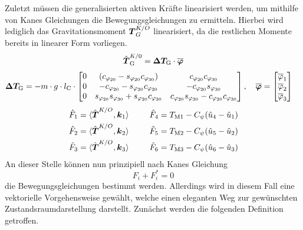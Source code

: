 Zuletzt müssen die generalisierten aktiven Kräfte linearisiert werden, um mithilfe von Kanes Gleichungen die Bewegungsgleichungen zu ermitteln. Hierbei wird lediglich das Gravitationsmoment $\boldsymbol{T}^{K/O}_G$ linearisiert, da die restlichen Momente bereits in linearer Form vorliegen.
\begin{align}
\hat{\boldsymbol{T}}^{K/0}_{\text{G}} = \boldsymbol{\Delta T_{\text{G}}} \cdot \boldsymbol{\overline{\varphi}}
\end{align}
\begin{align*}
\boldsymbol{\Delta T_{\text{G}}} = -m\cdot g\cdot l_{\text{C}}\cdot \begin{bmatrix}
0 & (c_{\varphi_{\text{20}}}-s_{\varphi_{\text{20}}}c_{\varphi_{\text{30}}}) & c_{\varphi_{\text{20}}}c_{\varphi_{\text{30}}} 
\\
0 & -c_{\varphi_{\text{20}}}-s_{\varphi_{\text{20}}}c_{\varphi_{\text{20}}} & -c_{\varphi_{\text{20}}}s_{\varphi_{\text{30}}} 
\\
0 & s_{\varphi_{\text{20}}}s_{\varphi_{\text{30}}}+s_{\varphi_{\text{20}}}c_{\varphi_{\text{30}}} & c_{\varphi_{\text{20}}}s_{\varphi_{\text{30}}}-c_{\varphi_{\text{20}}}c_{\varphi_{\text{30}}}
\end{bmatrix},\hspace{10pt}
\boldsymbol{\overline{\varphi}}&= \begin{bmatrix}
\overline{\varphi}_{\text{1}} \\ \overline{\varphi}_{\text{2}} \\ \overline{\varphi}_{\text{3}}
\end{bmatrix} \nonumber
\end{align*}
\begin{align}
\hat{F}_1 &= \langle {\hat{\boldsymbol{T}}^{K/O}}, {\boldsymbol{k}_{\text{1}}} \rangle &&\hspace{15pt}\hat{F}_{\text{4}} = T_{\text{M1}} - C_{\psi}(\hat{u}_{\text{4}} - \hat{u}_{\text{1}})
\\
\hat{F}_{\text{2}} &= \langle {\hat{\boldsymbol{T}}^{K/O}}, {\boldsymbol{k}_{\text{2}}} \rangle &&\hspace{15pt}\hat{F}_{\text{5}} = T_{\text{M2}} - C_{\psi}(\hat{u}_{\text{5}} - \hat{u}_{\text{2}})
\\
\hat{F}_{\text{3}} &= \langle {\hat{\boldsymbol{T}}^{K/O}}, {\boldsymbol{k}_{\text{3}}} \rangle &&\hspace{15pt}\hat{F}_{\text{6}} = T_{\text{M3}} - C_{\psi}(\hat{u}_{\text{6}} - \hat{u}_{\text{3}})
\end{align}
An dieser Stelle können nun prinzipiell nach Kanes Gleichung
\begin{equation}
F_i + F^*_i = 0
\end{equation}
die Bewegungsgleichungen bestimmt werden. Allerdings wird in diesem Fall eine vektorielle Vorgehensweise gewählt, welche einen eleganten Weg zur gewünschten Zustandsraumdarstellung darstellt. Zunächst werden die folgenden Definition getroffen.
